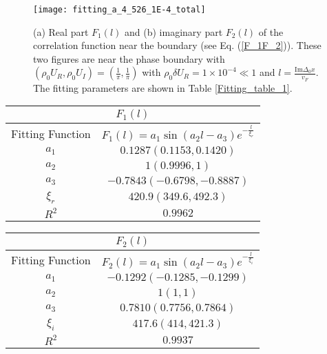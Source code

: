 \documentclass[aps,prl,twocolumn,superscriptaddress]{revtex4-1}
\begin{document}
\begin{bibunit}
\begin{table}
	\label{fitting_table_2}
\end{table}
\begin{figure}[t]
	\centering \texttt{[image: fitting\_a\_4\_526\_1E-4\_total]}
	\caption{(a) Real part $F_1(l)$ and (b) imaginary part $F_2(l)$ of the correlation function near the boundary (see Eq. (\ref{F_1F_2})). These two figures are near the phase boundary with $(\rho_{0}U_{R},\rho_{0}U_{I})=(\frac{1}{\pi},\frac{1}{\pi})$ with $\rho_{0}\delta U_{R}=1\times10^{-4}\ll1$ and $l=\frac{\text{Im}\Delta_0x}{v_F}.$ The fitting parameters are shown in Table \ref{Fitting_table_1}.}
	\label{fig1}
\end{figure}
\begin{table}
	\begin{tabular}{|c|c|}
		\hline 
		\multicolumn{2}{|c|}{$F_{1}(l)$}\tabularnewline		
		\hline
		\hline 
		Fitting Function & $F_1(l)=a_{1}\sin(a_{2}l-a_{3})e^{-\frac{l}{\xi_{r}}}$\tabularnewline
		\hline 
		$a_{1}$ & $0.1287(0.1153,0.1420)$\tabularnewline
		\hline 
		$a_{2}$ & $1(0.9996,1)$\tabularnewline
		\hline 
		$a_{3}$ & $-0.7843(-0.6798,-0.8887)$\tabularnewline
		\hline 
		$\xi_{r}$ & $420.9(349.6,492.3)$\tabularnewline
		\hline 
		$R^{2}$ & $0.9962$\tabularnewline
		\hline 
	\end{tabular}%
	\begin{tabular}{|c|c|}
		\hline 
		\multicolumn{2}{|c|}{$F_{2}(l)$}\tabularnewline
		\hline
		\hline 
		Fitting Function & $F_2(l)=a_{1}\sin(a_{2}l-a_{3})e^{-\frac{l}{\xi_i}}$\tabularnewline
		\hline 
		$a_{1}$ & $-0.1292(-0.1285,-0.1299)$\tabularnewline
		\hline 
		$a_{2}$ & $1(1,1)$\tabularnewline
		\hline 
		$a_{3}$ & $0.7810(0.7756,0.7864)$\tabularnewline
		\hline 
		$\xi_{i}$ & $417.6(414,421.3)$\tabularnewline
		\hline 
		$R^{2}$ & $0.9937$\tabularnewline
		\hline 
	\end{tabular}
	

\end{table}
\end{bibunit}
\end{document}
